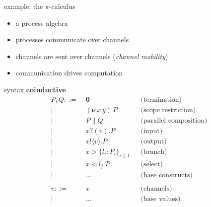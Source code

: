 \documentclass[dvipsnames]{beamer}
\newcommand{\sitem}{\item[\raisebox{.45ex}{\rule{.6ex}{.6ex}}]}
\newcommand{\picalc}{$\pi$-calculus}
\newcommand{\PO}{\textbf{0}}
\newcommand{\comp}[2]{#1 \parallel #2}
\newcommand{\new}[2]{(\boldsymbol{\nu} \, #1 \, #2) \,}
\newcommand{\send}[2]{#1 !\langle #2 \rangle .}
\newcommand{\recv}[2]{#1 ?( #2 ) .}
\newcommand{\branch}[3]{#1 \triangleright \{ #2 \}_{#3}}
\newcommand{\select}[2]{#1 \triangleleft #2 .}
\begin{document}
  \begin{frame}{example: the \picalc{}}
    \begin{itemize}
      \setlength\itemsep{1em}
      \sitem a process algebra
      \sitem processes communicate over channels
      \sitem channels are sent over channels (\emph{channel mobility})
      \sitem communication drives computation
    \end{itemize}
  \end{frame}

  \begin{frame}{syntax}
    \textbf{coinductive}
    \begin{align*}
        P, Q ::=& \; \PO                     &&\text{(termination)}    \\
        |& \; \new{x}{y}P                    &&\text{(scope restriction)} \\
        |& \; \comp{P}{Q}                    &&\text{(parallel composition)} \\
        |& \; \recv{x}{v}P                   &&\text{(input)}       \\
        |& \; \send{x}{v}P                   &&\text{(output)}       \\
        |& \; \branch{x}{l_i : P_i}{i \in I} &&\text{(branch)}       \\
        |& \; \select{x}{l_j}P               &&\text{(select)}       \\
        |& \; \ldots                         &&\text{(base constructs)} \\
        \\
        v ::=& \; x && \text{(channels)}\\
        | & \; \ldots && \text{(base values)}\\
    \end{align*}
  \end{frame}
\end{document}
